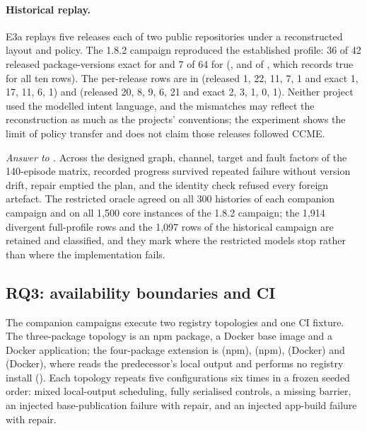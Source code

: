 \paragraph{Historical replay.}
E3a replays five releases each of two public repositories under a
reconstructed layout and policy. The 1.8.2 campaign reproduced the established
profile: 36 of 42 released package-versions exact for
 and 7 of 64 for 
(, and  of
, which records
 true for all ten rows). The per-release rows are
in  (released 1, 22, 11, 7, 1 and
exact 1, 17, 11, 6, 1) and  (released
20, 8, 9, 6, 21 and exact 2, 3, 1, 0, 1). Neither project used the modelled
intent language, and the mismatches may reflect the reconstruction as much as
the projects' conventions; the experiment shows the limit of policy transfer
and does not claim those releases followed CCME.

\emph{Answer to .} Across the designed graph, channel, target and
fault factors of the 140-episode matrix, recorded progress survived repeated
failure without version drift, repair emptied the plan, and the identity
check refused every foreign artefact. The restricted oracle agreed on all 300
histories of each companion campaign and on all 1,500 core instances of the
1.8.2 campaign; the 1,914 divergent full-profile rows and the 1,097 rows of the
historical campaign are retained and classified, and they mark where the
restricted models stop rather than where the implementation fails.

\subsection{RQ3: availability boundaries and CI}
\label{sec:eval:rq3}

The companion campaigns execute two registry topologies and one CI fixture.
The three-package topology is an npm package, a Docker base image and a Docker
application; the four-package extension is  (npm), 
(npm),  (Docker) and  (Docker), where  reads the
predecessor's local  output and performs no registry install
().
Each topology repeats five configurations six times in a frozen seeded order:
mixed local-output scheduling, fully serialised controls, a missing barrier,
an injected base-publication failure with repair, and an injected app-build
failure with repair.

